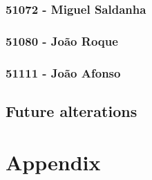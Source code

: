 \documentclass[oneside]{article}
\begin{document}
    \subsubsection{51072 - Miguel Saldanha}
    \subsubsection{51080 - João Roque}
    \subsubsection{51111 - João Afonso}

  \subsection{Future alterations}
  \label{sec:alterations}

\section{Appendix}
\label{appendix}
\end{document}
